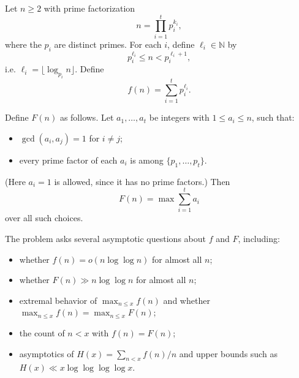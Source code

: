 Let $n\ge 2$ with prime factorization
\[
 n=\prod_{i=1}^t p_i^{k_i},
\]
where the $p_i$ are distinct primes.
For each $i$, define $\ell_i\in\mathbb N$ by
\[
 p_i^{\ell_i}\le n < p_i^{\ell_i+1},
\]
i.e. $\ell_i=\lfloor\log_{p_i} n\rfloor$.
Define
\[
 f(n)=\sum_{i=1}^t p_i^{\ell_i}.
\]

Define $F(n)$ as follows. Let $a_1,\dots,a_t$ be integers with $1\le a_i\le n$, such that:
\begin{itemize}
\item $\gcd(a_i,a_j)=1$ for $i\ne j$;
\item every prime factor of each $a_i$ is among $\{p_1,\dots,p_t\}$.
\end{itemize}
(Here $a_i=1$ is allowed, since it has no prime factors.)
Then
\[
 F(n)=\max \sum_{i=1}^t a_i
\]
over all such choices.

The problem asks several asymptotic questions about $f$ and $F$, including:
\begin{itemize}
\item whether $f(n)=o(n\log\log n)$ for almost all $n$;
\item whether $F(n)\gg n\log\log n$ for almost all $n$;
\item extremal behavior of $\max_{n\le x} f(n)$ and whether $\max_{n\le x} f(n)=\max_{n\le x}F(n)$;
\item the count of $n<x$ with $f(n)=F(n)$;
\item asymptotics of $H(x)=\sum_{n<x} f(n)/n$ and upper bounds such as $H(x)\ll x\log\log\log\log x$.
\end{itemize}

